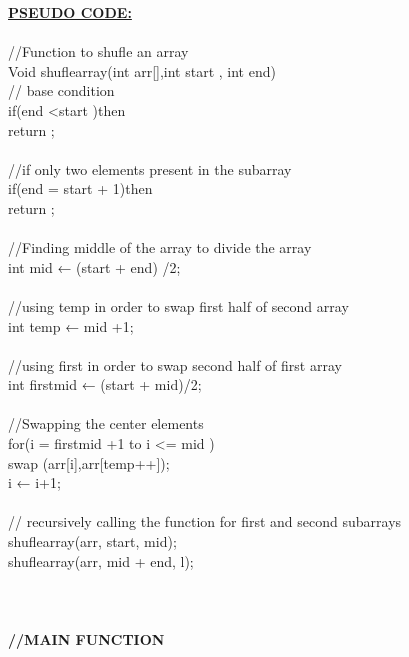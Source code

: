 \documentclass[conference]{IEEEtran}
\begin{document}
\textbf{\underline{PSEUDO CODE:}}\\\\
//Function to shufle an array\\
Void shuflearray(int arr[],int start , int end) \\
// base condition \\
\indent\hspace{0.5cm} if(end  \textless  start )then\\
\indent\hspace{1.0cm} return ;\\\\
//if only two elements present in the subarray\\
\indent\hspace{0.5cm} if(end  = start + 1)then\\
\indent\hspace{1.0cm} return ;\\\\
//Finding middle of the array to divide the array\\
int mid ← (start + end) /2;\\\\
//using  temp in order to swap first half of second array\\
int  temp ← mid +1;\\\\
//using  first in order to swap second half of first array\\
int firstmid ← (start + mid)/2;\\\\
//Swapping the center elements\\
for(i = firstmid +1 to i \textless = mid )\\
\indent\hspace{0.5cm}swap (arr[i],arr[temp++]);\\
\indent\hspace{0.5cm}i ← i+1;\\\\
// recursively calling the function for first and second subarrays\\
shuflearray(arr, start, mid);\\
shuflearray(arr, mid + end, l);\\\\\\\\

\textbf{//MAIN FUNCTION}\\
\end{document}
